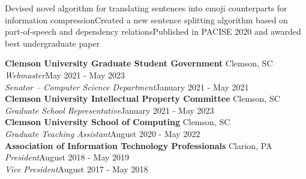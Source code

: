 \documentclass[letter]{article}
\begin{document}

            {Devised novel algorithm for translating sentences into emoji counterparts for information compression}{Created a new sentence splitting algorithm based on part-of-speech and dependency relations}{Published in PACISE 2020 and awarded best undergraduate paper}


            \textbf{Clemson University Graduate Student Government} \hfill Clemson, SC\\
            \textit{Webmaster}\hfill{}May 2021 - May 2023\\
            \textit{Senator -- Computer Science Department}\hfill{}January 2021 - May 2021\\
    \vspace{\interspace}
            \textbf{Clemson University Intellectual Property Committee} \hfill Clemson, SC\\
        \textit{Graduate School Representative}\hfill{}January 2021 - May 2023\\
    \vspace{\interspace}
            \textbf{Clemson University School of Computing} \hfill Clemson, SC\\
        \textit{Graduate Teaching Assistant}\hfill{}August 2020 - May 2022\\
    \vspace{\interspace}
            \textbf{Association of Information Technology Professionals} \hfill Clarion, PA\\
            \textit{President}\hfill{}August 2018 - May 2019\\
            \textit{Vice President}\hfill{}August 2017 - May 2018\\



\end{document}
